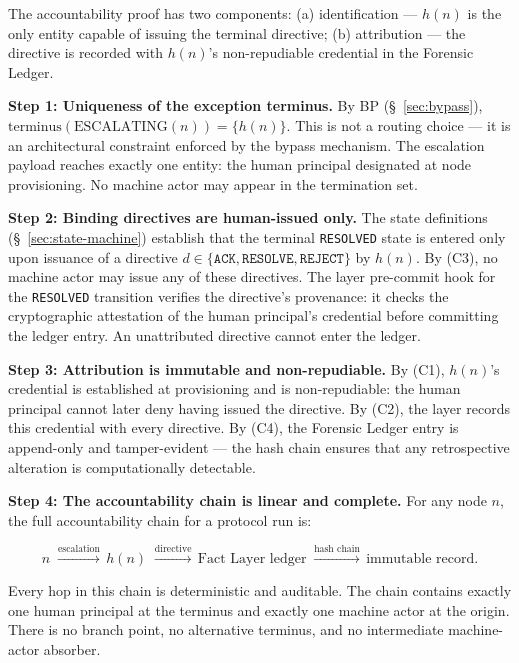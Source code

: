 The accountability proof has two components: (a) identification — $h(n)$ is the only entity capable of issuing the terminal directive; (b) attribution — the directive is recorded with $h(n)$'s non-repudiable credential in the Forensic Ledger.

\medskip
\noindent\textbf{Step 1: Uniqueness of the exception terminus.} By BP (\S~\ref{sec:bypass}), $\text{terminus}(\text{ESCALATING}(n)) = \{h(n)\}$. This is not a routing choice — it is an architectural constraint enforced by the bypass mechanism. The escalation payload reaches exactly one entity: the human principal designated at node provisioning. No machine actor may appear in the termination set.

\medskip
\noindent\textbf{Step 2: Binding directives are human-issued only.} The state definitions (\S~\ref{sec:state-machine}) establish that the terminal \texttt{RESOLVED} state is entered only upon issuance of a directive $d \in \{\texttt{ACK}, \texttt{RESOLVE}, \texttt{REJECT}\}$ by $h(n)$. By (C3), no machine actor may issue any of these directives. The \fact{} layer pre-commit hook for the \texttt{RESOLVED} transition verifies the directive's provenance: it checks the cryptographic attestation of the human principal's credential before committing the ledger entry. An unattributed directive cannot enter the ledger.

\medskip
\noindent\textbf{Step 3: Attribution is immutable and non-repudiable.} By (C1), $h(n)$'s credential is established at provisioning and is non-repudiable: the human principal cannot later deny having issued the directive. By (C2), the \fact{} layer records this credential with every directive. By (C4), the Forensic Ledger entry is append-only and tamper-evident — the hash chain ensures that any retrospective alteration is computationally detectable.

\medskip
\noindent\textbf{Step 4: The accountability chain is linear and complete.} For any node $n$, the full accountability chain for a protocol run is:

\[
n \;\xrightarrow{\text{escalation}}\, h(n) \;\xrightarrow{\text{directive}}\, \text{Fact Layer ledger} \;\xrightarrow{\text{hash chain}}\, \text{immutable record}.
\]

Every hop in this chain is deterministic and auditable. The chain contains exactly one human principal at the terminus and exactly one machine actor at the origin. There is no branch point, no alternative terminus, and no intermediate machine-actor absorber.

